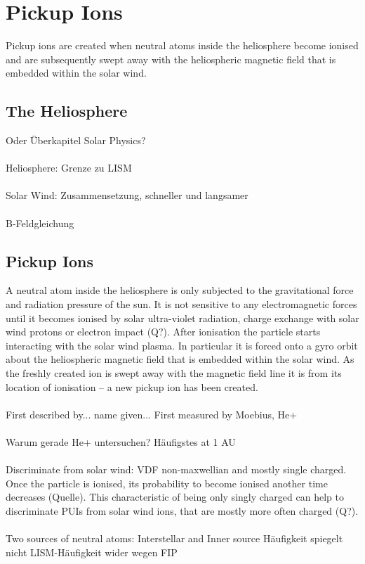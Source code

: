 
\chapter{Pickup Ions} %

\label{Chapter1} %





Pickup ions are created when neutral atoms inside the heliosphere become ionised and are subsequently swept away with the heliospheric magnetic field that is embedded within the solar wind.


\section{The Heliosphere}

Oder Überkapitel Solar Physics?
\\ \\
Heliosphere: Grenze zu LISM
\\ \\
Solar Wind: Zusammensetzung, schneller und langsamer \\ \\
B-Feldgleichung


\section{Pickup Ions}
A neutral atom inside the heliosphere is only subjected to the gravitational force and radiation pressure of the sun. It is not sensitive to any electromagnetic forces until it becomes ionised by solar ultra-violet radiation, charge exchange with solar wind protons or electron impact (Q?). After ionisation the particle starts interacting with the solar wind plasma. In particular it is forced onto a gyro orbit about the heliospheric magnetic field
that is embedded within the solar wind. As the freshly created ion is swept away with the magnetic field line it is  from its location of ionisation -- a new pickup ion has been created.
\\ \\
First described by... name given...
First measured by Moebius, He+
\\ \\
Warum gerade He+ untersuchen? Häufigstes at 1 AU
\\ \\
Discriminate from solar wind: VDF non-maxwellian and mostly single charged.
Once the particle is ionised, its probability to become ionised another time decreases (Quelle). This characteristic of being only singly charged can help to discriminate PUIs from solar wind ions, that are mostly more often charged (Q?).
\\ \\
Two sources of neutral atoms: Interstellar and Inner source
 Häufigkeit spiegelt nicht LISM-Häufigkeit wider wegen FIP
